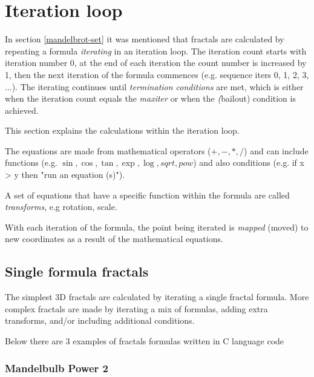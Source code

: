 \section{Iteration loop}\label{iteration-loop}

In section \ref{mandelbrot-set} it was mentioned that fractals are calculated
by repeating a formula \emph{iterating} in an iteration loop. The iteration count starts with iteration number 0, at the end of each iteration the count number is increased by 1, then the next iteration of the formula commences (e.g. sequence iters 0, 1, 2, 3, ...). The iterating continues until \emph{termination conditions} are met, which is either when the iteration count equals the \emph{maxiter} or when the \emph({bailout}) condition is achieved.

This section explains the calculations within the iteration loop.


The equations are made from mathematical operators ($+, -, *, /$) 
and can include functions (e.g. $\sin, \cos, \tan, \exp, \log, sqrt, pow$) 
and also conditions (e.g. if x > y then "run an equation (s)").

A set of equations that have a specific function within the formula are called \emph{transforms}, e.g rotation, scale.

With each iteration of the formula, the point being iterated is \emph{mapped} (moved) to new coordinates as a result of the mathematical equations.  

\subsection{Single formula fractals}\label{single-formula-fractals}

The simplest 3D fractals are calculated by iterating a single fractal formula. More complex fractals are made by iterating a mix of formulas, adding extra transforms, and/or including additional conditions. 

Below there are 3 examples of fractals formulas written in C language code

\subsubsection{Mandelbulb Power 2} \nopagebreak

